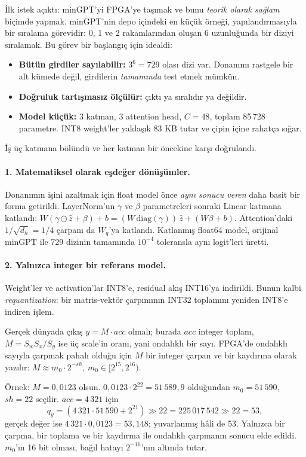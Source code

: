 
\neden
İlk istek açıktı: minGPT'yi FPGA'ye taşımak ve bunu \emph{teorik olarak sağlam} biçimde yapmak. minGPT'nin depo içindeki en küçük örneği,  yapılandırmasıyla bir sıralama görevidir: 0, 1 ve 2 rakamlarından oluşan 6 uzunluğunda bir diziyi sıralamak. Bu görev bir başlangıç için idealdi:
\begin{itemize}
  \item \textbf{Bütün girdiler sayılabilir:} $3^6 = 729$ olası dizi var. Donanımı rastgele bir alt kümede değil, girdilerin \emph{tamamında} test etmek mümkün.
  \item \textbf{Doğruluk tartışmasız ölçülür:} çıktı ya sıralıdır ya değildir.
  \item \textbf{Model küçük:} 3 katman, 3 attention head, $C = 48$, toplam 85\,728 parametre. INT8 weight'ler yaklaşık 83 KB tutar ve çipin içine rahatça sığar.
\end{itemize}

\neyapildi
İş üç katmana bölündü ve her katman bir öncekine karşı doğrulandı.

\paragraph{1. Matematiksel olarak eşdeğer dönüşümler.} Donanımın işini azaltmak için float model önce \emph{aynı sonucu veren} daha basit bir forma getirildi. LayerNorm'un $\gamma$ ve $\beta$ parametreleri sonraki Linear katmana katlandı: $W(\gamma\odot\hat z+\beta)+b = (W\,\mathrm{diag}(\gamma))\,\hat z + (W\beta+b)$. Attention'daki $1/\sqrt{d_h} = 1/4$ çarpanı da $W_q$'ya katlandı. Katlanmış float64 model, orijinal minGPT ile 729 dizinin tamamında $10^{-4}$ toleransla aynı logit'leri üretti.

\paragraph{2. Yalnızca integer bir referans model.} Weight'ler ve activation'lar INT8'e, residual akış INT16'ya indirildi. Bunun kalbi \emph{requantization}: bir matris-vektör çarpımının INT32 toplamını yeniden INT8'e indiren işlem.

\begin{ozet}
Gerçek dünyada çıkış $y = M\cdot acc$ olmalı; burada $acc$ integer toplam, $M = S_w S_x / S_y$ ise üç scale'in oranı, yani ondalıklı bir sayı. FPGA'de ondalıklı sayıyla çarpmak pahalı olduğu için $M$ bir integer çarpan ve bir kaydırma olarak yazılır: $M \approx m_0\cdot 2^{-sh}$, $m_0 \in [2^{15}, 2^{16})$.

Örnek: $M = 0{,}0123$ olsun. $0{,}0123\cdot 2^{22} = 51\,589{,}9$ olduğundan $m_0 = 51\,590$, $sh = 22$ seçilir. $acc = 4\,321$ için
\[ q_y = (4\,321\cdot 51\,590 + 2^{21}) \gg 22 = 225\,017\,542 \gg 22 = 53, \]
gerçek değer ise $4\,321\cdot 0{,}0123 = 53{,}148$; yuvarlanmış hâli de 53. Yalnızca bir çarpma, bir toplama ve bir kaydırma ile ondalıklı çarpmanın sonucu elde edildi. $m_0$'ın 16 bit olması, bağıl hatayı $2^{-16}$'nın altında tutar.
\end{ozet}

